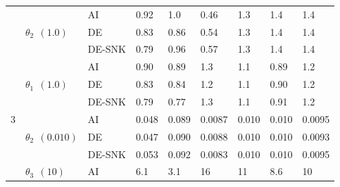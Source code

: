 \begin{table}[ht]
\begin{tabularx}{\textwidth}{lllXXXXXX}
\cmidrule(lr){4-6} \cmidrule(lr){7-9}
& \multirow{3}{*}{$\theta_2 \:\: (1.0)$} & AI & 0.92 \cellcolor[HTML]{108700} & 1.0 \cellcolor[HTML]{008000} & 0.46 \cellcolor[HTML]{A2D000} & 1.3 \cellcolor[HTML]{3A9C00} & 1.4 \cellcolor[HTML]{49A400} & 1.4 \cellcolor[HTML]{409F00} \\
& & DE & 0.83 \cellcolor[HTML]{269200} & 0.86 \cellcolor[HTML]{208F00} & 0.54 \cellcolor[HTML]{80BF00} & 1.3 \cellcolor[HTML]{3A9C00} & 1.4 \cellcolor[HTML]{4CA500} & 1.4 \cellcolor[HTML]{46A200} \\
& & DE-SNK & 0.79 \cellcolor[HTML]{309700} & 0.96 \cellcolor[HTML]{088300} & 0.57 \cellcolor[HTML]{76BA00} & 1.3 \cellcolor[HTML]{3A9C00} & 1.4 \cellcolor[HTML]{49A400} & 1.4 \cellcolor[HTML]{48A300} \\
\cmidrule(lr){1-3} \cmidrule(lr){4-6} \cmidrule(lr){7-9}
\multirow{9}{*}{3} & \multirow{3}{*}{$\theta_1 \:\: (1.0)$} & AI & 0.90 \cellcolor[HTML]{148900} & 0.89 \cellcolor[HTML]{188B00} & 1.3 \cellcolor[HTML]{309700} & 1.1 \cellcolor[HTML]{168A00} & 0.89 \cellcolor[HTML]{168A00} & 1.2 \cellcolor[HTML]{229000} \\
& & DE & 0.83 \cellcolor[HTML]{269200} & 0.84 \cellcolor[HTML]{249100} & 1.2 \cellcolor[HTML]{2E9600} & 1.1 \cellcolor[HTML]{168A00} & 0.90 \cellcolor[HTML]{148900} & 1.2 \cellcolor[HTML]{269200} \\
& & DE-SNK & 0.79 \cellcolor[HTML]{329800} & 0.77 \cellcolor[HTML]{389B00} & 1.3 \cellcolor[HTML]{3A9C00} & 1.1 \cellcolor[HTML]{148900} & 0.91 \cellcolor[HTML]{148900} & 1.2 \cellcolor[HTML]{229000} \\
\cmidrule(lr){4-6} \cmidrule(lr){7-9}
& \multirow{3}{*}{$\theta_2 \:\: (0.010)$} & AI & 0.048 \cellcolor[HTML]{FFB200} & 0.089 \cellcolor[HTML]{FF3400} & 0.0087 \cellcolor[HTML]{1C8D00} & 0.010 \cellcolor[HTML]{028000} & 0.010 \cellcolor[HTML]{068200} & 0.0095 \cellcolor[HTML]{0A8400} \\
& & DE & 0.047 \cellcolor[HTML]{FFB800} & 0.090 \cellcolor[HTML]{FF3000} & 0.0088 \cellcolor[HTML]{188B00} & 0.010 \cellcolor[HTML]{028000} & 0.010 \cellcolor[HTML]{048100} & 0.0093 \cellcolor[HTML]{0E8600} \\
& & DE-SNK & 0.053 \cellcolor[HTML]{FFA200} & 0.092 \cellcolor[HTML]{FF2900} & 0.0083 \cellcolor[HTML]{269200} & 0.010 \cellcolor[HTML]{068200} & 0.010 \cellcolor[HTML]{048100} & 0.0095 \cellcolor[HTML]{0A8400} \\
\cmidrule(lr){4-6} \cmidrule(lr){7-9}
& \multirow{3}{*}{$\theta_3 \:\: (10)$} & AI & 6.1 \cellcolor[HTML]{66B200} & 3.1 \cellcolor[HTML]{F8FB00} & 16 \cellcolor[HTML]{60AF00} & 11 \cellcolor[HTML]{0A8400} & 8.6 \cellcolor[HTML]{1E8E00} & 10 \cellcolor[HTML]{088300} \\

\end{tabularx}
\end{table}
